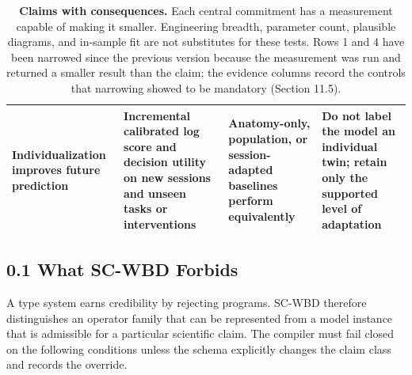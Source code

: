 \begin{table}[t]
\begin{tabularx}{\textwidth}{@{}p{}p{}p{}X@{}}
Individualization improves future prediction &
Incremental calibrated log score and decision utility on new sessions and
unseen tasks or interventions &
Anatomy-only, population, or session-adapted baselines perform equivalently &
Do not label the model an individual twin; retain only the supported level of
adaptation\\
\bottomrule
\end{tabularx}
\caption{\textbf{Claims with consequences.} Each central commitment has a
measurement capable of making it smaller. Engineering breadth, parameter
count, plausible diagrams, and in-sample fit are not substitutes for these
tests. Rows 1 and 4 have been narrowed since the previous version because the
measurement was run and returned a smaller result than the claim; the evidence
columns record the controls that narrowing showed to be mandatory
(Section 11.5).}
\label{tab:claim-gates}
\end{table}

\subsection{0.1 What SC-WBD Forbids}

A type system earns credibility by rejecting programs. SC-WBD therefore
distinguishes an operator family that can be represented from a model instance
that is admissible for a particular scientific claim. The compiler must fail
closed on the following conditions unless the schema explicitly changes the
claim class and records the override.

